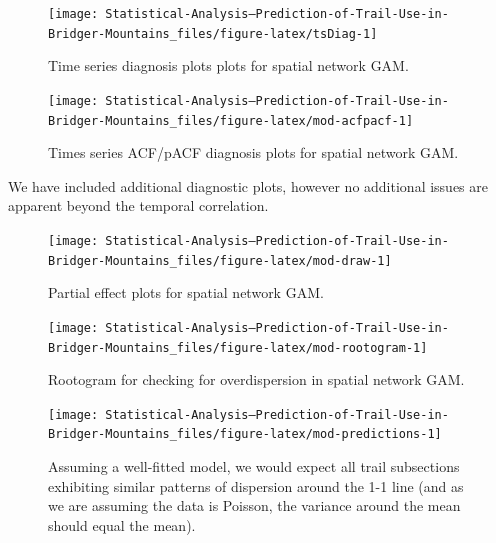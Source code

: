 \documentclass[
]{book}
\begin{document}
\begin{figure}

{\centering \texttt{[image: Statistical-Analysis--Prediction-of-Trail-Use-in-Bridger-Mountains\_files/figure-latex/tsDiag-1]} 

}

\caption{Time series diagnosis plots plots for spatial network GAM.}\label{fig:tsDiag}
\end{figure}

\begin{figure}

{\centering \texttt{[image: Statistical-Analysis--Prediction-of-Trail-Use-in-Bridger-Mountains\_files/figure-latex/mod-acfpacf-1]} 

}

\caption{Times series ACF/pACF diagnosis plots for spatial network GAM.}\label{fig:mod-acfpacf}
\end{figure}

We have included additional diagnostic plots, however no additional issues are apparent beyond the temporal correlation.

\begin{figure}

{\centering \texttt{[image: Statistical-Analysis--Prediction-of-Trail-Use-in-Bridger-Mountains\_files/figure-latex/mod-draw-1]} 

}

\caption{Partial effect plots for spatial network GAM.}\label{fig:mod-draw}
\end{figure}

\begin{figure}

{\centering \texttt{[image: Statistical-Analysis--Prediction-of-Trail-Use-in-Bridger-Mountains\_files/figure-latex/mod-rootogram-1]} 

}

\caption{Rootogram for checking for overdispersion in spatial network GAM.}\label{fig:mod-rootogram}
\end{figure}

\begin{figure}

{\centering \texttt{[image: Statistical-Analysis--Prediction-of-Trail-Use-in-Bridger-Mountains\_files/figure-latex/mod-predictions-1]} 

}

\caption{Assuming a well-fitted model, we would expect all trail subsections exhibiting similar patterns of dispersion around the 1-1 line (and as we are assuming the data is Poisson, the variance around the mean should equal the mean).}\label{fig:mod-predictions}
\end{figure}
\end{document}
